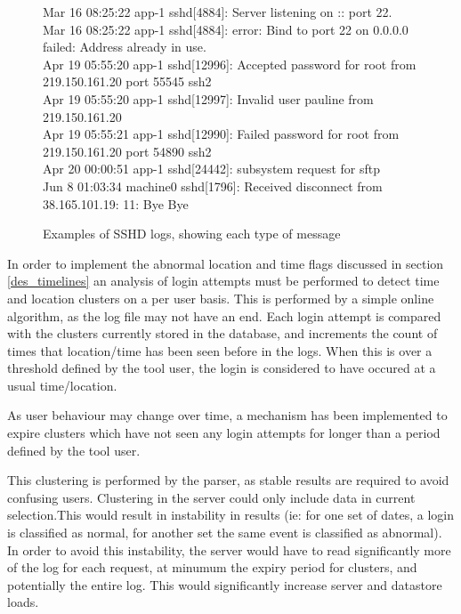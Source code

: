 \begin{figure}[tbh]
\parbox{.99\textwidth}{
{\small Mar 16 08:25:22 app-1 sshd[4884]: Server listening on :: port 22. \\
Mar 16 08:25:22 app-1 sshd[4884]: error: Bind to port 22 on 0.0.0.0 failed: Address already in use. \\
Apr 19 05:55:20 app-1 sshd[12996]: Accepted password for root from 219.150.161.20 port 55545 ssh2 \\
Apr 19 05:55:20 app-1 sshd[12997]: Invalid user pauline from 219.150.161.20 \\
Apr 19 05:55:21 app-1 sshd[12990]: Failed password for root from 219.150.161.20 port 54890 ssh2 \\
Apr 20 00:00:51 app-1 sshd[24442]: subsystem request for sftp \\
Jun 8 01:03:34 machine0 sshd[1796]: Received disconnect from 38.165.101.19: 11: Bye Bye \\}}
\caption{Examples of SSHD logs, showing each type of message}
\label{log_examples}
\end{figure}

In order to implement the abnormal location and time flags discussed in section \ref{des_timelines} an analysis of login attempts must be performed to detect time and location clusters on a per user basis. This is performed by a simple online algorithm, as the log file may not have an end. Each login attempt is compared with the clusters currently stored in the database, and increments the count of times that location/time has been seen before in the logs. When this is over a threshold defined by the tool user, the login is considered to have occured at a usual time/location.

As user behaviour may change over time, a mechanism has been implemented to expire clusters which have not seen any login attempts for longer than a period defined by the tool user. 

This clustering is performed by the parser, as stable results are required to avoid confusing users. Clustering in the server could only include data in current selection.This would result in instability in results (ie: for one set of dates, a login is classified as normal, for another set the same event is classified as abnormal). In order to avoid this instability, the server would have to read significantly more of the log for each request, at minumum the expiry period for clusters, and potentially the entire log. This would significantly increase server and datastore loads.

